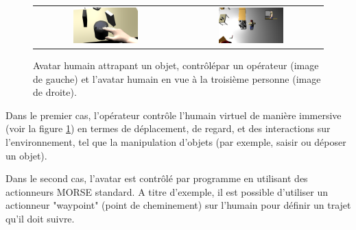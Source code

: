 \documentclass[a4paper,11pt,twoside]{StyleThese}
\begin{document}


\begin{figure}[ht!]
 \centering
 \begin{tabular}{cc}
  \includegraphics[width=0.475\textwidth]{img/Screenshot_from_2014-04-29_14_02_14.png} &
  \includegraphics[width=0.475\textwidth]{img/Screenshot_from_2014-04-29_14_21_24.png}
 \end{tabular}
 \caption{Avatar humain attrapant un objet, contrôlépar un opérateur (image de gauche) et l'avatar humain en vue à la troisième personne (image de droite).}
 \label{fig:human_morse}
   \vspace{-3pt}
 \end{figure}

Dans le premier cas, l'opérateur contrôle l'humain virtuel de manière immersive (voir la figure \ref{fig:human_morse}) en termes de déplacement, de regard, et des interactions sur l'environnement, tel que la manipulation d'objets (par exemple, saisir ou déposer un objet).

Dans le second cas, l'avatar est contrôlé par programme en utilisant des actionneurs MORSE standard. A titre d'exemple, il est possible d'utiliser un actionneur "waypoint" (point de cheminement) sur l'humain pour définir un trajet qu'il doit suivre.
\end{document}
